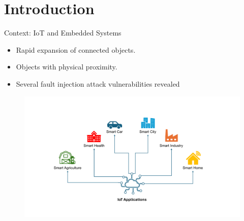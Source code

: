 \section*{Introduction}

\begin{frame}{Context: IoT and Embedded Systems}
	\begin{minipage}[c]{0.4\textwidth}
        \begin{itemize}
            [square]
            \justifying
            \item Rapid expansion of connected objects.
            \item Objects with physical proximity.
            \item Several fault injection attack vulnerabilities revealed
        \end{itemize}
	\end{minipage}\hfill%
	\begin{minipage}[c]{0.6\textwidth}
		\begin{figure}
			\centering
			\includegraphics[width=\textwidth]{src/1_introduction/img/iotapplications.pdf}
			\label{fig:iot_application}
		\end{figure}
	\end{minipage}
\end{frame}

